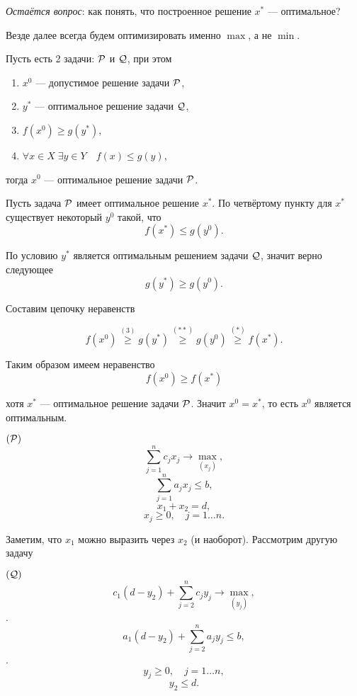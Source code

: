 \textit{Остаётся вопрос}: как понять, что построенное решение $x^*$ --- оптимальное?

\remark

Везде далее всегда будем оптимизировать именно $\max$, а не $\min$.

\label{fact:reduction_to_other_problem}

Пусть есть 2 задачи: $\P$ и $\Q$, при этом
\begin{enumerate}[nosep]
	\item $x^0$ --- допустимое решение задачи $\P$,
	
	\item $y^*$ --- оптимальное решение задачи $\Q$,
	
	\item $f(x^0) \ge g(y^*)$,
	
	\item $\forall x \in X \; \exists y \in Y \quad f(x) \le g(y)$,
\end{enumerate}

тогда $x^0$ --- оптимальное решение задачи $\P$.

\prooof

Пусть задача $\P$ имеет оптимальное решение $x^*$. По четвёртому пункту для $x^*$ существует некоторый $y^0$ такой, что 
\[
	f(x^*) \le g(y^0). \tag{*}
\]

По условию $y^*$ является оптимальным решением задачи $\Q$, значит верно следующее
\[
	g(y^*) \ge g(y^0). \tag{**}
\]

Составим цепочку неравенств

\[
	f(x^0) \stackrel{(3)}{\ge} g(y^*) \stackrel{(**)}{\ge} g(y^0) \stackrel{(*)}{\ge} f(x^*).
\]

Таким образом имеем неравенство
\[
	f(x^0) \ge f(x^*)
\]

хотя $x^*$ --- оптимальное решение задачи $\P$. Значит $x^0 = x^*$, то есть $x^0$ является оптимальным.

\example

$(\P)$
\[\sum_{j=1}^{n} c_j x_j \to \max_{(x_j)},\]
\[\sum_{j=1}^{n} a_j x_j \le b \tag{1},\]
\[x_1 + x_2 = d \tag{2},\]
\[x_j \ge 0, \quad j = 1\dots n. \tag{3}\]

Заметим, что $x_1$ можно выразить через $x_2$ (и наоборот). Рассмотрим другую задачу

$(\Q)$
\[c_1(d - y_2) + \sum_{j=2}^{n} c_j y_j \to \max_{(y_j)},\].
\[a_1 (d-y_2) + \sum_{j=2}^{n}a_j y_j \le b,\].
\[y_j \ge 0, \quad j = 1\dots n,\]
\[y_2 \le d.\]


